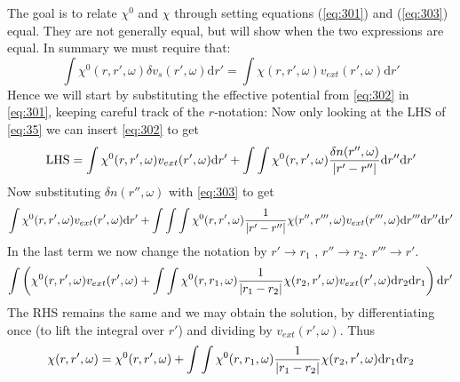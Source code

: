 \begin{solution}
The goal is to relate $\chi^{0}$ and $\chi$ through setting equations (\ref{eq:301}) and (\ref{eq:303}) equal. They are not generally equal, but will show when the two expressions are equal. In summary we must require that: 
\begin{equation}
    \int \chi^{0}(r,r',\omega)\delta v_s(r',\omega)\mathrm{d}r' = \int \chi(r,r',\omega)v_{ext}(r',\omega)\mathrm{d}r'
    \label{eq:35}
\end{equation}
Hence we will start by substituting the effective potential from \eqref{eq:302} in \eqref{eq:301}, keeping careful track of the $r$-notation:
Now only looking at the LHS of \eqref{eq:35} we can insert \eqref{eq:302} to get
\begin{equation}
   \mathrm{LHS} = \int \chi^{0}(r,r',\omega)v_{ext}(r',\omega) \mathrm{d}r' + \int\int \chi^{0}(r,r',\omega)\dfrac{\delta n(r'',\omega)}{\abs{r'-r''}}\mathrm{d}r''\mathrm{d}r'
\end{equation}
Now substituting $\delta n(r'',\omega)$ with \eqref{eq:303} to get
{\small
\begin{equation}
   \int \chi^{0}(r,r',\omega)v_{ext}(r',\omega) \mathrm{d}r' + \int\int\int \chi^{0}(r,r',\omega)\dfrac{1}{\abs{r'-r''}}\chi(r'',r''',\omega)v_{ext}(r''',\omega)\mathrm{d}r'''\mathrm{d}r''\mathrm{d}r'
\end{equation}}
In the last term we now change the notation by $r' \rightarrow r_1$ , $r'' \rightarrow r_2$. $r''' \rightarrow r'$.
\begin{equation}
   \int \left( \chi^{0}(r,r',\omega)v_{ext}(r',\omega) + \int\int \chi^{0}(r,r_1,\omega)\dfrac{1}{\abs{r_1-r_2}}\chi(r_2,r',\omega)v_{ext}(r',\omega)\mathrm{d}r_2\mathrm{d}r_1 \right) \mathrm{d}r'
\end{equation}
The RHS remains the same and we may obtain the solution, by differentiating once (to lift the integral over $r'$) and dividing by $v_{ext}(r',\omega)$. Thus
\begin{equation}
    \chi(r,r',\omega) = \chi^{0}(r,r',\omega) + \int\int \chi^{0}(r,r_1,\omega) \dfrac{1}{\abs{r_1-r_2}}\chi(r_2,r',\omega)\mathrm{d}r_1\mathrm{d}r_2
\end{equation}
\end{solution}

